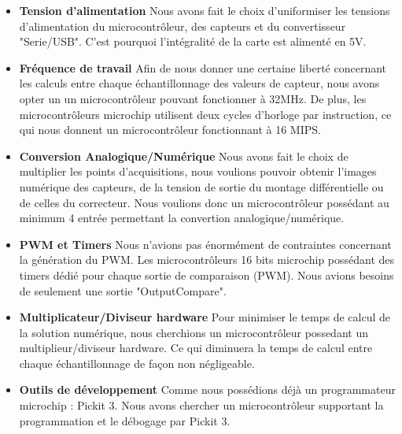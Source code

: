 \documentclass[11pt, french]{article} %
\begin{document}
\begin{itemize}
	\item \textbf{Tension d'alimentation}
	Nous avons fait le choix d'uniformiser les tensions d'alimentation du microcontrôleur, des capteurs et du convertisseur "Serie/USB". C'est pourquoi l'intégralité de la carte est alimenté en 5V.

	\item \textbf{Fréquence de travail}
	Afin de nous donner une certaine liberté concernant les calculs entre chaque échantillonnage des valeurs de capteur, nous avons opter un un microcontrôleur pouvant fonctionner à 32MHz. De plus, les microcontrôleurs microchip utilisent deux cycles d'horloge par instruction, ce qui nous donnent un microcontrôleur fonctionnant à 16 MIPS.

	\item \textbf{Conversion Analogique/Numérique}
 	Nous avons fait le choix de multiplier les points d'acquisitions, nous voulions pouvoir obtenir l'images numérique des capteurs, de la tension de sortie du montage différentielle ou de celles du correcteur. Nous voulions donc un microcontrôleur possédant au minimum 4 entrée permettant la convertion analogique/numérique.

	\item \textbf{PWM et Timers} 
	Nous n'avions pas énormément de contraintes concernant la génération du PWM. Les microcontrôleurs 16 bits microchip possédant des timers dédié pour chaque sortie de comparaison (PWM). Nous avions besoins de seulement une sortie "OutputCompare".

	\item \textbf{Multiplicateur/Diviseur hardware}
	Pour minimiser le temps de calcul de la solution numérique, nous cherchions un microcontrôleur possedant un multiplieur/diviseur hardware. Ce qui diminuera la temps de calcul entre chaque échantillonnage de façon non négligeable.

	\item \textbf{Outils de développement}
	Comme nous possédions déjà un programmateur microchip : Pickit 3. Nous avons chercher un microcontrôleur supportant la programmation et le débogage par Pickit 3.

\end{itemize}
\end{document}
